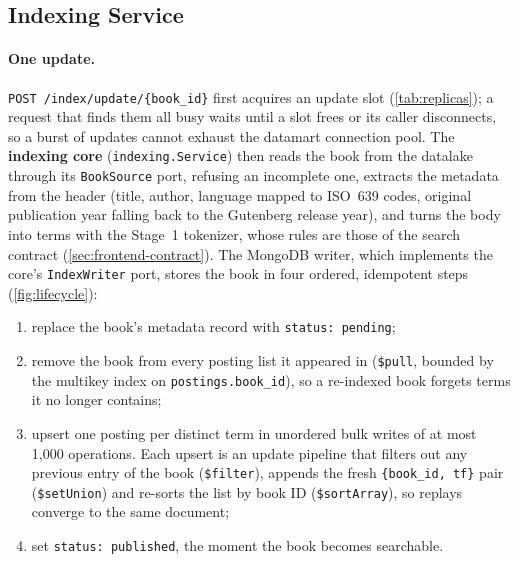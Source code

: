 \documentclass[10pt,a4paper]{article}
\newcommand{\code}[1]{\texttt{#1}}
\newcommand{\route}[1]{\texttt{#1}}
\begin{document}
\subsection{Indexing Service}
\label{sec:impl-indexing}

\paragraph{One update.}
\route{POST /index/update/\allowbreak\{book\_id\}} first acquires an update slot
(\cref{tab:replicas}); a request that finds them all busy waits until a slot
frees or its caller disconnects, so a burst of updates cannot exhaust the
datamart connection pool. The \textbf{indexing core} (\code{indexing.Service})
then reads the book from the datalake through its \code{BookSource} port,
refusing an incomplete one, extracts the metadata from the header (title,
author, language mapped to ISO~639 codes, original publication year falling
back to the Gutenberg release year), and turns the body into terms with the
Stage~1 tokenizer, whose rules are those of the search contract
(\cref{sec:frontend-contract}). The MongoDB writer,
which implements the core's \code{IndexWriter} port, stores the book in four
ordered, idempotent steps (\cref{fig:lifecycle}):

\begin{enumerate}
  \item replace the book's metadata record with \code{status: pending};
  \item remove the book from every posting list it appeared in
  (\code{\$pull}, bounded by the multikey index on \code{postings.book\_id}),
  so a re-indexed book forgets terms it no longer contains;
  \item upsert one posting per distinct term in unordered bulk writes of at
  most 1{,}000 operations. Each upsert is an update pipeline that filters out
  any previous entry of the book (\code{\$filter}), appends the fresh
  \code{\{book\_id, tf\}} pair (\code{\$setUnion}) and re-sorts the list by
  book ID (\code{\$sortArray}), so replays converge to the same document;
  \item set \code{status: published}, the moment the book becomes searchable.
\end{enumerate}
\end{document}
